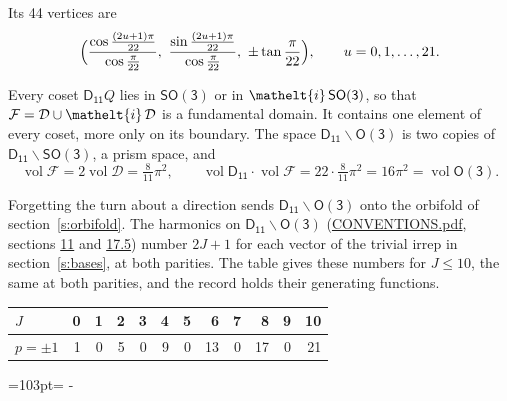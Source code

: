 \documentclass[10pt,a4paper]{article}
\newcommand{\needspace}[1]{\par\penalty-100\begingroup\dimen0=#1\relax\dimen2=\pagegoal
  \advance\dimen2-\pagetotal\ifdim\dimen0>\dimen2\relax\ifdim\dimen2>0pt\vfil\break\fi\fi
  \endgroup}
\numberwithin{equation}{section}
\newcommand{\eltfont}[1]{{\let\sigma\eltsigma\mathelt{#1}}}
\newcommand{\grp}[1]{\mathsf{#1}}
\newcommand{\elt}[1]{\eltfont{#1}}
\newcommand{\vol}{\operatorname{vol}}
\newcommand{\fcell}{\mathcal{D}}
\newcommand{\fdomain}{\mathcal{F}}
\begin{document}
\leavevmode\label{n:local.vertex.u}Its 44 vertices are
\begin{equation}\label{e:prism}\Bigl(\frac{\cos\frac{(2u+1)\pi}{22}}{\cos\frac{\pi}{22}},\ \frac{\sin\frac{(2u+1)\pi}{22}}{\cos\frac{\pi}{22}},\ \pm\tan\frac{\pi}{22}\Bigr),\qquad u = 0, 1, \dots, 21.\end{equation}

\leavevmode\label{n:set.fundamental}Every coset $\grp{D_{11}}Q$ lies in \href{SO3.pdf}{$\grp{SO(3)}$} or in $\elt{i}\,\grp{SO(3)}$, so that $\fdomain = \fcell \cup \elt{i}\,\fcell$ is a fundamental domain. It contains one element of every coset, more only on its boundary.
The space $\grp{D_{11}}\backslash\grp{O(3)}$ is two copies of $\grp{D_{11}}\backslash\grp{SO(3)}$, a prism space, and
\begin{equation}\label{e:volume}\vol\fdomain = 2\vol\fcell = \tfrac{8}{11}\pi^2,\qquad \vol\grp{D_{11}}\cdot\vol\fdomain = 22\cdot \tfrac{8}{11}\pi^2 = 16\pi^2 = \vol\grp{O(3)}.\end{equation}

Forgetting the turn about a direction sends $\grp{D_{11}}\backslash\grp{O(3)}$ onto the orbifold of section~\ref{s:orbifold}.
The harmonics on $\grp{D_{11}}\backslash\grp{O(3)}$ (\href{../../CONVENTIONS.pdf}{CONVENTIONS.pdf}, sections \href{../../CONVENTIONS.pdf\#conv.11}{11} and \href{../../CONVENTIONS.pdf\#conv.17.5}{17.5}) number $2J + 1$ for each vector of the trivial irrep in section~\ref{s:bases}, at both parities. The table gives these numbers for $J \le 10$, the same at both parities, and the record holds their generating functions.
{\small\setlength{\tabcolsep}{4pt}\begin{longtable}{@{}lrrrrrrrrrrr@{}}\toprule
$J$ & 0 & 1 & 2 & 3 & 4 & 5 & 6 & 7 & 8 & 9 & 10\\\midrule\endhead
\bottomrule\endfoot\endlastfoot
$p = \pm 1$ & 1 & 0 & 5 & 0 & 9 & 0 & 13 & 0 & 17 & 0 & 21\\
\bottomrule\end{longtable}}
\needspace{103pt}
\end{document}
